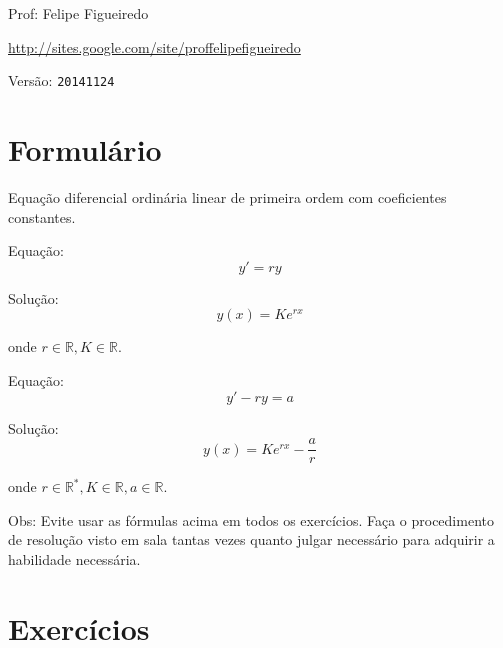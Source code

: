 \documentclass[a4paper]{article}
\begin{document}
\parbox[c]{.825\textwidth}{\raggedright%
{Prof: Felipe Figueiredo\par}
{\url{http://sites.google.com/site/proffelipefigueiredo}\par}
}

Versão: \verb|20141124|




\section{Formulário}

Equação diferencial ordinária linear de primeira ordem com
coeficientes constantes.

\bigskip
Equação:
\begin{displaymath}
  y' = ry
\end{displaymath}

Solução:
\begin{displaymath}
  y(x) = K e^{rx}
\end{displaymath}

onde $r \in \mathbb{R}, K \in \mathbb{R}$.

\bigskip

Equação:
\begin{displaymath}
  y' -ry = a
\end{displaymath}

Solução:
\begin{displaymath}
  y(x) = K e^{rx} - \frac{a}{r}
\end{displaymath}

onde $r \in \mathbb{R}^*, K \in \mathbb{R}, a \in \mathbb{R}$.

\bigskip
Obs: Evite usar as fórmulas acima em todos os exercícios. Faça o
procedimento de resolução visto em sala tantas vezes quanto julgar
necessário para adquirir a habilidade necessária.

\section{Exercícios}
\end{document}
